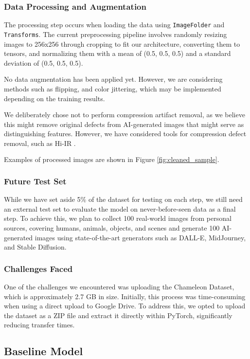 \documentclass{article} %
\begin{document}
\subsubsection{Data Processing and Augmentation}
The processing step occurs when loading the data using \texttt{ImageFolder} and \texttt{Transforms}. The current preprocessing pipeline involves randomly resizing images to 256x256 through cropping to fit our architecture, converting them to tensors, and normalizing them with a mean of (0.5, 0.5, 0.5) and a standard deviation of (0.5, 0.5, 0.5). 

No data augmentation has been applied yet. However, we are considering methods such as flipping, and color jittering, which may be implemented depending on the training results.

We deliberately chose not to perform compression artifact removal, as we believe this might remove original defects from AI-generated images that might serve as distinguishing features. However, we have considered tools for compression defect removal, such as Hi-IR \citep{li2024hierarchicalinformationflowgeneralized}.

Examples of processed images are shown in Figure \ref{fig:cleaned_sample}.


\subsubsection{Future Test Set}
While we have set aside 5\% of the dataset for testing on each step, we still need an external test set to evaluate the model on never-before-seen data as a final step. To achieve this, we plan to
collect 100 real-world images from personal sources, covering humans, animals, objects, and scenes and generate 100 AI-generated images using state-of-the-art generators such as DALL-E, MidJourney, and Stable Diffusion.

\subsubsection{Challenges Faced}
One of the challenges we encountered was uploading the Chameleon Dataset, which is approximately 2.7 GB in size. Initially, this process was time-consuming when using a direct upload to Google Drive. To address this, we opted to upload the dataset as a ZIP file and extract it directly within PyTorch, significantly reducing transfer times.

\subsection{Baseline Model}
\end{document}
